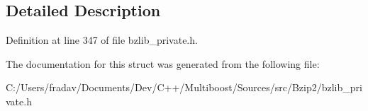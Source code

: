 \subsection{Detailed Description}


Definition at line 347 of file bzlib\-\_\-private.\-h.



The documentation for this struct was generated from the following file\-:\begin{DoxyCompactItemize}
\item 
C\-:/\-Users/fradav/\-Documents/\-Dev/\-C++/\-Multiboost/\-Sources/src/\-Bzip2/bzlib\-\_\-private.\-h\end{DoxyCompactItemize}

